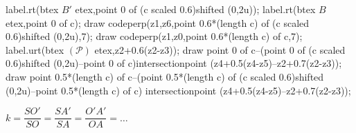 \begin{exemples*1}
\begin{minipage}{0.4\linewidth}
\begin{center}
{\begin{Geometrie}[CoinBG={(-6u,-10u)},CoinHD={(6u,10u)}]
                    label.rt(btex $B'$ etex,point 0 of (c scaled 0.6)shifted (0,2u));
                    label.rt(btex $B$ etex,point 0 of c);
                    draw codeperp(z1,z6,point 0.6*(length c) of (c scaled 0.6)shifted (0,2u),7);
                    draw codeperp(z1,z0,point 0.6*(length c) of c,7);
                    label.urt(btex $(\mathcal P)$ etex,z2+0.6(z2-z3));
                    draw point 0 of c--(point 0 of (c scaled 0.6)shifted (0,2u)--point 0 of c)intersectionpoint (z4+0.5(z4-z5)--z2+0.7(z2-z3));
                    draw point 0.5*(length c) of c--(point 0.5*(length c) of (c scaled 0.6)shifted (0,2u)--point 0.5*(length c) of c) intersectionpoint (z4+0.5(z4-z5)--z2+0.7(z2-z3));
                \end{Geometrie}
            }
            
            \smallskip
            $k=\dfrac{SO'}{SO}=\dfrac{SA'}{SA}=\dfrac{O'A'}{OA}=\ldots$
        

\end{center}
\end{minipage}
\end{exemples*1}

